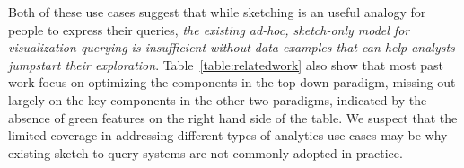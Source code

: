 \par Both of these use cases suggest that while sketching is an useful analogy for people to express their queries, \emph{the existing ad-hoc, sketch-only model for visualization querying is insufficient without data examples that can help analysts jumpstart their exploration}. Table~\ref{table:relatedwork} also show that most past work focus on optimizing the components in the top-down paradigm, missing out largely on the key components in the other two paradigms, indicated by the absence of green features on the right hand side of the table. We suspect that the limited coverage in addressing different types of analytics use cases may be why existing sketch-to-query systems are not commonly adopted in practice. %

